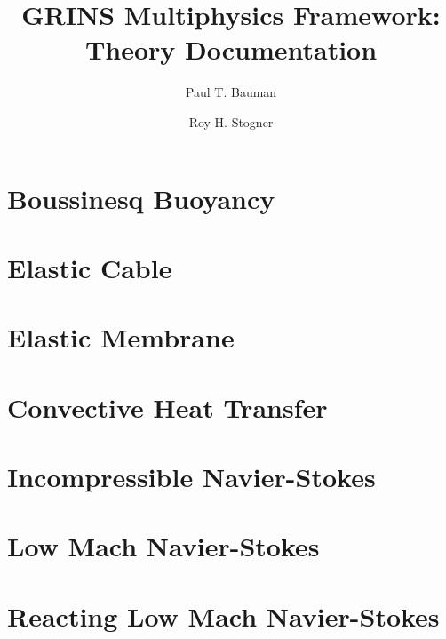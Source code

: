 \documentclass[twoside]{report}
\begin{document}
\author{Paul T. Bauman \and Roy H. Stogner}
\title{GRINS Multiphysics Framework:\\
Theory Documentation}
\maketitle
\tableofcontents

\chapter{Boussinesq Buoyancy}

\chapter{Elastic Cable}

\chapter{Elastic Membrane}

\chapter{Convective Heat Transfer}

\chapter{Incompressible Navier-Stokes}

\chapter{Low Mach Navier-Stokes}

\chapter{Reacting Low Mach Navier-Stokes}
\end{document}
